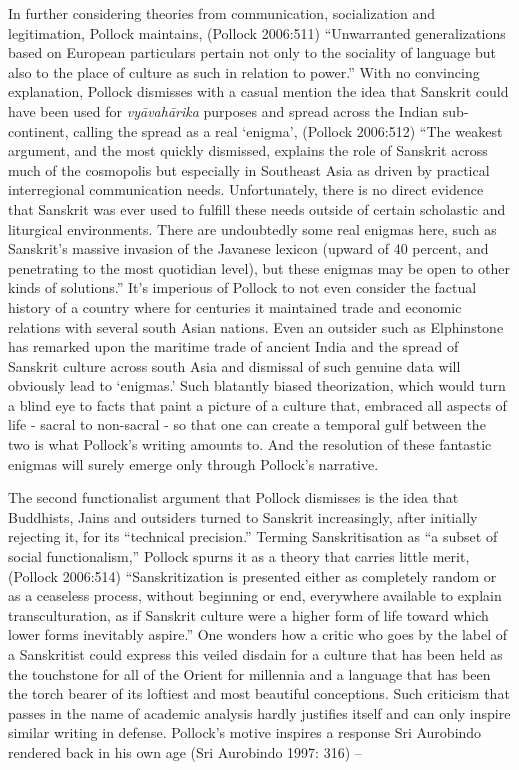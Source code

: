 In further considering theories from communication, socialization and legitimation, Pollock maintains, (Pollock 2006:511) “Unwarranted generalizations based on European particulars pertain not only to the sociality of language but also to the place of culture as such in relation to power.” With no convincing explanation, Pollock dismisses with a casual mention the idea that Sanskrit could have been used for \textit{vyāvahārika} purposes and spread across the Indian sub-continent, calling the spread as a real ‘enigma’, (Pollock 2006:512) “The weakest argument, and the most quickly dismissed, explains the role of Sanskrit across much of the cosmopolis but especially in Southeast Asia as driven by practical interregional communication needs. Unfortunately, there is no direct evidence that Sanskrit was ever used to fulfill these needs outside of certain scholastic and liturgical environments. There are undoubtedly some real enigmas here, such as Sanskrit’s massive invasion of the Javanese lexicon (upward of 40 percent, and penetrating to the most quotidian level), but these enigmas may be open to other kinds of solutions.” It’s imperious of Pollock to not even consider the factual history of a country where for centuries it maintained trade and economic relations with several south Asian nations. Even an outsider such as Elphinstone has remarked upon the maritime trade of ancient India and the spread of Sanskrit culture across south Asia and dismissal of such genuine data will obviously lead to ‘enigmas.’ Such blatantly biased theorization, which would turn a blind eye to facts that paint a picture of a culture that, embraced all aspects of life - sacral to non-sacral - so that one can create a temporal gulf between the two is what Pollock’s writing amounts to. And the resolution of these fantastic enigmas will surely emerge only through Pollock’s narrative.

The second functionalist argument that Pollock dismisses is the idea that Buddhists, Jains and outsiders turned to Sanskrit increasingly, after initially rejecting it, for its “technical precision.” Terming Sanskritisation as “a subset of social functionalism,” Pollock spurns it as a theory that carries little merit, (Pollock 2006:514) “Sanskritization is presented either as completely random or as a ceaseless process, without beginning or end, everywhere available to explain transculturation, as if Sanskrit culture were a higher form of life toward which lower forms inevitably aspire.” One wonders how a critic who goes by the label of a Sanskritist could express this veiled disdain for a culture that has been held as the touchstone for all of the Orient for millennia and a language that has been the torch bearer of its loftiest and most beautiful conceptions. Such criticism that passes in the name of academic analysis hardly justifies itself and can only inspire similar writing in defense. Pollock’s motive inspires a response Sri Aurobindo rendered back in his own age (Sri Aurobindo 1997: 316) –

